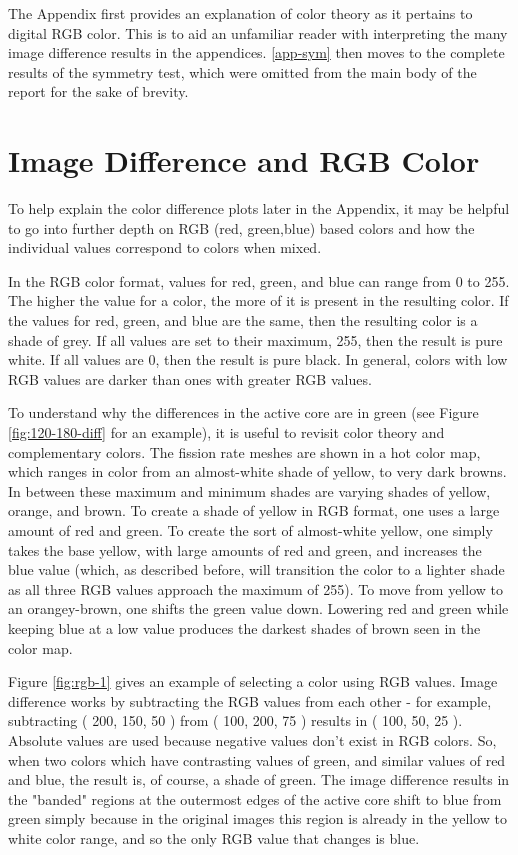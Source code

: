 
\label{app}

The Appendix first provides an explanation of color theory as it pertains to digital RGB color.  This is to aid an unfamiliar reader with interpreting the many image difference results in the appendices.  \autoref{app-sym} then moves to the complete results of the symmetry test, which were omitted from the main body of the report for the sake of brevity. 

\section{Image Difference and RGB Color}
\label{app-rgb}
To help explain the color difference plots later in the Appendix, it may be helpful to go into further depth on RGB (red, green,blue) based colors and how the individual values correspond to colors when mixed.

In the RGB color format, values for red, green, and blue can range from 0 to 255.  The higher the value for a color, the more of it is present in the resulting color.  If the values for red, green, and blue are the same, then the resulting color is a shade of grey.  If all values are set to their maximum, 255, then the result is pure white.  If all values are 0, then the result is pure black.  In general, colors with low RGB values are darker than  ones with greater RGB values.

To understand why the differences in the active core are in green (see Figure \ref{fig:120-180-diff} for an example), it is useful to revisit color theory and complementary colors.  The fission rate meshes are shown in a hot color map, which ranges in color from an almost-white shade of yellow, to very dark browns.  In between these maximum and minimum shades are varying shades of yellow, orange, and brown.  To create a shade of yellow in RGB format, one uses a large amount of red and green.  To create the sort of almost-white yellow, one simply takes the base yellow, with large amounts of red and green, and increases the blue value (which, as described before, will transition the color to a lighter shade as all three RGB values approach the maximum of 255).  To move from yellow to an orangey-brown, one shifts the green value down.  Lowering red and green while keeping blue at a low value produces the darkest shades of brown seen in the color map.



Figure \ref{fig:rgb-1} gives an example of selecting a color using RGB values.  Image difference works by subtracting the RGB values from each other - for example, subtracting ( 200, 150, 50 ) from ( 100, 200, 75 ) results in ( 100, 50, 25 ).  Absolute values are used because negative values don't exist in RGB colors.  So, when  two colors which have contrasting values of green, and similar values of red and blue, the result is, of course, a shade of green.  The image difference results in the "banded" regions at the outermost edges of the active core shift to blue from green simply because in the original images this region is already in the yellow to white color range, and so the only RGB value that changes is blue.


